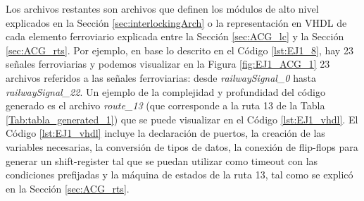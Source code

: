 	Los archivos restantes son archivos que definen los módulos de alto nivel explicados en la Sección \ref{sec:interlockingArch} o la representación en VHDL de cada elemento ferroviario explicada entre la Sección \ref{sec:ACG_lc} y la Sección \ref{sec:ACG_rts}. Por ejemplo, en base lo descrito en el Código \ref{lst:EJ1_8}, hay 23 señales ferroviarias y podemos visualizar en la Figura \ref{fig:EJ1_ACG_1} 23 archivos referidos a las señales ferroviarias: desde \textit{railwaySignal\_0} hasta \textit{railwaySignal\_22}. Un ejemplo de la complejidad y profundidad del código generado es el archivo \textit{route\_13} (que corresponde a la ruta 13 de la Tabla \ref{Tab:tabla_generated_1}) que se puede visualizar en el Código \ref{lst:EJ1_vhdl}.	El Código \ref{lst:EJ1_vhdl} incluye la declaración de puertos, la creación de las variables necesarias, la conversión de tipos de datos, la conexión de flip-flops para generar un shift-register tal que se puedan utilizar como timeout con las condiciones prefijadas y la máquina de estados de la ruta 13, tal como se explicó en la Sección \ref{sec:ACG_rts}.
	
